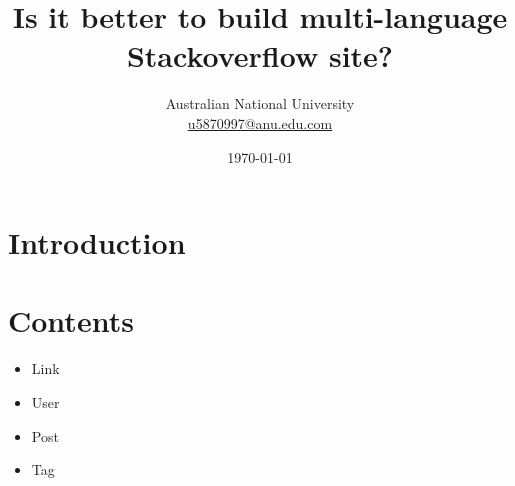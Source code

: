 \documentclass[A4paper,twoside,twocolumn]{article}
\title{Is it better to build multi-language Stackoverflow site?} %
\author{%
\normalsize Australian National University \\ %
\normalsize \href{mailto:u5870997@anu.edu.com}{u5870997@anu.edu.com} %
}
\date{\today} %
\begin{document}
\maketitle


\section{Introduction}



\section{Contents}

\begin{itemize}
\item Link
\item User
\item Post
\item Tag
\end{itemize}

\end{document}
